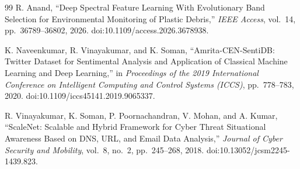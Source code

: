 \documentclass[a4paper,fleqn]{cas-sc}
\begin{document}
\begin{thebibliography}{99}
R. Anand,
``Deep Spectral Feature Learning With Evolutionary Band Selection for Environmental Monitoring of Plastic Debris,''
\textit{IEEE Access},
vol.~14,
pp.~36789--36802,
2026.
doi:10.1109/access.2026.3678938.

K. Naveenkumar, R. Vinayakumar, and K. Soman,
``Amrita-CEN-SentiDB: Twitter Dataset for Sentimental Analysis and Application of Classical Machine Learning and Deep Learning,''
in \textit{Proceedings of the 2019 International Conference on Intelligent Computing and Control Systems (ICCS)},
pp.~778--783,
2020.
doi:10.1109/iccs45141.2019.9065337.

R. Vinayakumar, K. Soman, P. Poornachandran, V. Mohan, and A. Kumar,
``ScaleNet: Scalable and Hybrid Framework for Cyber Threat Situational Awareness Based on DNS, URL, and Email Data Analysis,''
\textit{Journal of Cyber Security and Mobility},
vol.~8,
no.~2,
pp.~245--268,
2018.
doi:10.13052/jcsm2245-1439.823.

\end{thebibliography}
\end{document}
